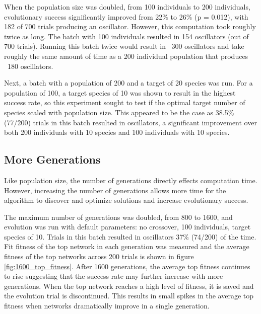 \documentclass[12pt]{report}
\begin{document}
When the population size was doubled, from 100 individuals to 200 individuals, evolutionary success significantly improved from 22\% to 26\% (p = 0.012), with 182 of 700 trials producing an oscillator. However, this computation took roughly twice as long. The batch with 100 individuals resulted in 154 oscillators (out of 700 trials). Running this batch twice would result in ~300 oscillators and take roughly the same amount of time as a 200 individual population that produces ~180 oscillators.

Next, a batch with a population of 200 and a target of 20 species was run. For a population of 100, a target species of 10 was shown to result in the highest success rate, so this experiment sought to test if the optimal target number of species scaled with population size. This appeared to be the case as 38.5\% (77/200) trials in this batch resulted in oscillators, a significant improvement over both 200 individuals with 10 species and 100 individuals with 10 species. 

\subsection{More Generations}
Like population size, the number of generations directly effects computation time. However, increasing the number of generations allows more time for the algorithm to discover and optimize solutions and increase evolutionary success. 

The maximum number of generations was doubled, from 800 to 1600, and evolution was run with default parameters: no crossover, 100 individuals, target species of 10. Trials in this batch resulted in oscillators 37\% (74/200) of the time. Fit fitness of the top network in each generation was measured and the average fitness of the top networks across 200 trials is shown in figure \ref{fig:1600_top_fitness}. After 1600 generations, the average top fitness continues to rise suggesting that the success rate may further increase with more generations. When the top network reaches a high level of fitness, it is saved and the evolution trial is discontinued. This results in small spikes in the average top fitness when networks dramatically improve in a single generation.  
\end{document}
